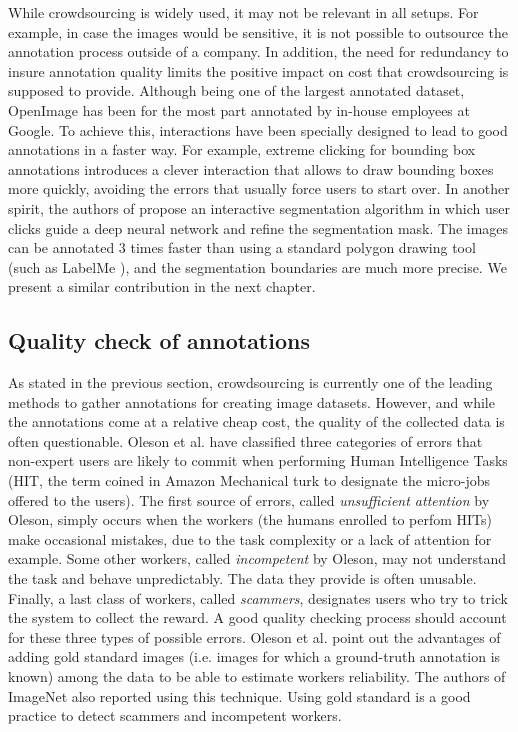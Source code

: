 While crowdsourcing is widely used, it may not be relevant in all setups. For example, in case the images would be sensitive, it is not possible to outsource the annotation process outside of a company. In addition, the need for redundancy to insure annotation quality limits the positive impact on cost that crowdsourcing is supposed to provide. Although being one of the largest annotated dataset, OpenImage has been for the most part annotated by in-house employees at Google. To achieve this, interactions have been specially designed to lead to good annotations in a faster way. For example, extreme clicking for bounding box annotations \cite{papadopoulos2017extreme} introduces a clever interaction that allows to draw bounding boxes more quickly, avoiding the errors that usually force users to start over. In another spirit, the authors of \cite{OpenImagesSegmentation} propose an interactive segmentation algorithm in which user clicks guide a deep neural network and refine the segmentation mask. The images can be annotated 3 times faster than using a standard polygon drawing tool (such as LabelMe \cite{russell2008labelme}), and the segmentation boundaries are much more precise. We present a similar contribution in the next chapter.


\subsection{Quality check of annotations}
\label{sec:annotation_quality}

As stated in the previous section, crowdsourcing is currently one of the leading methods to gather annotations for creating image datasets. However, and while the annotations come at a relative cheap cost, the quality of the collected data is often questionable. Oleson et al. \cite{oleson2011programmatic} have classified three categories of errors that non-expert users are likely to commit when performing Human Intelligence Tasks (HIT, the term coined in Amazon Mechanical turk to designate the micro-jobs offered to the users). The first source of errors, called \textit{unsufficient attention} by Oleson, simply occurs when the workers (the humans enrolled to perfom HITs) make occasional mistakes, due to the task complexity or a lack of attention for example. Some other workers, called \textit{incompetent} by Oleson, may not understand the task and behave unpredictably. The data they provide is often unusable. Finally, a last class of workers, called \textit{scammers}, designates users who try to trick the system to collect the reward. A good quality checking process should account for these three types of possible errors. Oleson et al. point out the advantages of adding gold standard images (i.e. images for which a ground-truth annotation is known) among the data to be able to estimate workers reliability. The authors of ImageNet \cite{ILSVRC15} also reported using this technique. Using gold standard is a good practice to detect scammers and incompetent workers.

